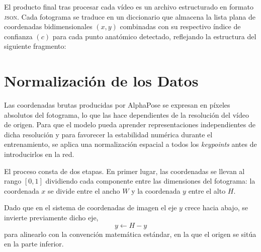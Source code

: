 El producto final tras procesar cada vídeo es un archivo estructurado en formato \textsc{json}.
Cada fotograma se traduce en un diccionario que almacena la lista plana de coordenadas bidimensionales $(x, y)$ combinadas con su respectivo índice de confianza $(c)$ para cada punto anatómico detectado, reflejando la estructura del siguiente fragmento:





\section{Normalización de los Datos}
Las coordenadas brutas producidas por AlphaPose se expresan en píxeles absolutos del fotograma, lo que las hace dependientes de la resolución del vídeo de origen.
Para que el modelo pueda aprender representaciones independientes de dicha resolución y para favorecer la estabilidad numérica durante el entrenamiento, se aplica una normalización espacial a todos los \textit{keypoints} antes de introducirlos en la red.

El proceso consta de dos etapas.
En primer lugar, las coordenadas se llevan al rango $[0,1]$ dividiendo cada componente entre las dimensiones del fotograma: la coordenada
$x$ se divide entre el ancho $W$ y la coordenada $y$ entre el alto $H$.

Dado que en el sistema de coordenadas de imagen el eje $y$ crece hacia abajo, se invierte previamente dicho eje,\begin{equation*}y \leftarrow H - y\end{equation*} para alinearlo con la convención matemática estándar, en la que el origen se sitúa en la parte inferior.

